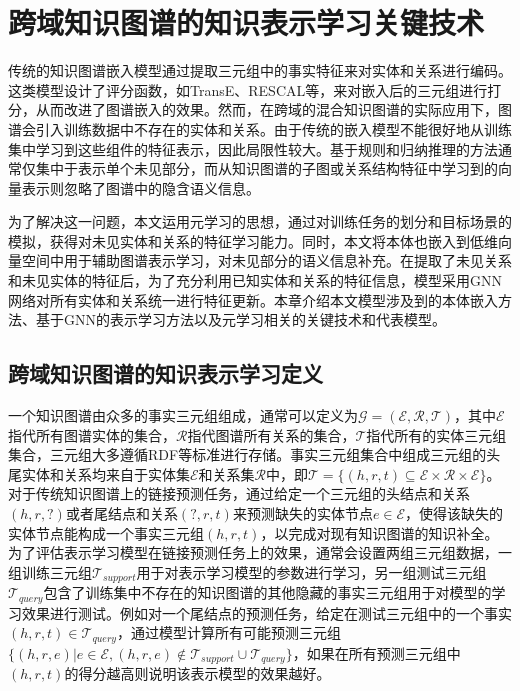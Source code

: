 \chapter{跨域知识图谱的知识表示学习关键技术}
传统的知识图谱嵌入模型通过提取三元组中的事实特征来对实体和关系进行编码。这类模型设计了评分函数，如TransE、RESCAL等，来对嵌入后的三元组进行打分，从而改进了图谱嵌入的效果。然而，在跨域的混合知识图谱的实际应用下，图谱会引入训练数据中不存在的实体和关系。由于传统的嵌入模型不能很好地从训练集中学习到这些组件的特征表示，因此局限性较大。基于规则和归纳推理的方法通常仅集中于表示单个未见部分，而从知识图谱的子图或关系结构特征中学习到的向量表示则忽略了图谱中的隐含语义信息。

为了解决这一问题，本文运用元学习的思想，通过对训练任务的划分和目标场景的模拟，获得对未见实体和关系的特征学习能力。同时，本文将本体也嵌入到低维向量空间中用于辅助图谱表示学习，对未见部分的语义信息补充。在提取了未见关系和未见实体的特征后，为了充分利用已知实体和关系的特征信息，模型采用GNN网络对所有实体和关系统一进行特征更新。本章介绍本文模型涉及到的本体嵌入方法、基于GNN的表示学习方法以及元学习相关的关键技术和代表模型。

\section{跨域知识图谱的知识表示学习定义}
一个知识图谱由众多的事实三元组组成，通常可以定义为\(\mathcal{G} = (\mathcal{E},\mathcal{R},\mathcal{T})\)，其中\(\mathcal{E}\)指代所有图谱实体的集合，\(\mathcal{R}\)指代图谱所有关系的集合，\(\mathcal{T}\)指代所有的实体三元组集合，三元组大多遵循RDF等标准进行存储。事实三元组集合中组成三元组的头尾实体和关系均来自于实体集\(\mathcal{E}\)和关系集\(\mathcal{R}\)中，即\(\mathcal{T}=\{(h,r,t) \subseteq \mathcal{E} \times \mathcal{R} \times \mathcal{E}\}\)。
对于传统知识图谱上的链接预测任务，通过给定一个三元组的头结点和关系\((h,r,?)\)或者尾结点和关系\((?,r,t)\)来预测缺失的实体节点\(e \in \mathcal{E}\)，使得该缺失的实体节点能构成一个事实三元组\((h,r,t)\)，以完成对现有知识图谱的知识补全。为了评估表示学习模型在链接预测任务上的效果，通常会设置两组三元组数据，一组训练三元组\(\mathcal{T}_{support}\)用于对表示学习模型的参数进行学习，另一组测试三元组\(\mathcal{T}_{query}\)包含了训练集中不存在的知识图谱的其他隐藏的事实三元组用于对模型的学习效果进行测试。例如对一个尾结点的预测任务，给定在测试三元组中的一个事实\((h,r,t) \in \mathcal{T}_{query}\)，通过模型计算所有可能预测三元组\(\{(h,r,e) | e \in \mathcal{E}, (h,r,e) \notin \mathcal{T}_{support} \cup \mathcal{T}_{query}\}\)，如果在所有预测三元组中\((h,r,t)\)的得分越高则说明该表示模型的效果越好。

